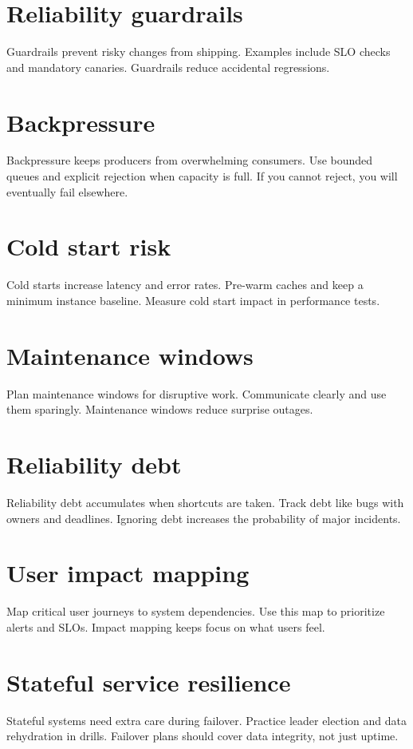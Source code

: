 \section{Reliability guardrails}
Guardrails prevent risky changes from shipping.
Examples include SLO checks and mandatory canaries.
Guardrails reduce accidental regressions.

\section{Backpressure}
Backpressure keeps producers from overwhelming consumers.
Use bounded queues and explicit rejection when capacity is full.
If you cannot reject, you will eventually fail elsewhere.

\section{Cold start risk}
Cold starts increase latency and error rates.
Pre-warm caches and keep a minimum instance baseline.
Measure cold start impact in performance tests.

\section{Maintenance windows}
Plan maintenance windows for disruptive work.
Communicate clearly and use them sparingly.
Maintenance windows reduce surprise outages.

\section{Reliability debt}
Reliability debt accumulates when shortcuts are taken.
Track debt like bugs with owners and deadlines.
Ignoring debt increases the probability of major incidents.

\section{User impact mapping}
Map critical user journeys to system dependencies.
Use this map to prioritize alerts and SLOs.
Impact mapping keeps focus on what users feel.

\section{Stateful service resilience}
Stateful systems need extra care during failover.
Practice leader election and data rehydration in drills.
Failover plans should cover data integrity, not just uptime.

